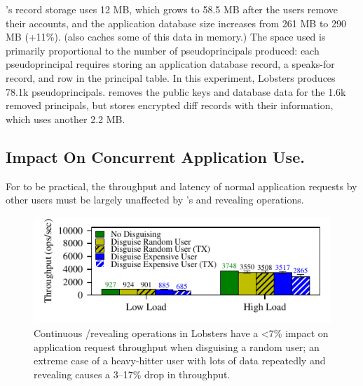 %
\sys's record storage uses 12 MB, which grows to
58.5 MB after the users remove their accounts, and the application database
size increases from 261 MB to 290 MB (+11\%).
%
(\sys also caches some of this data in memory.)
%
The space used is primarily proportional to the number of pseudoprincipals
produced: each pseudoprincipal requires storing an application database record, a
speaks-for record, and row in the principal table.
%
In this experiment, Lobsters produces 78.1k pseudoprincipals.
%
%
%
%
\sys removes the public keys and database data for the 1.6k removed principals, but
stores encrypted diff records with their information, which uses another 2.2 MB.
%
%

\subsection{Impact On Concurrent Application Use.}
\label{s:eval-conc}

%
%
%
For \sys to be practical, the throughput and latency of normal application requests
by other users must be largely unaffected by \sys's \xxing and revealing operations.
%
%

\begin{figure}[t]
    \centering
    \includegraphics[width=\columnwidth]{figs/lobsters_concurrent_results}
    \caption{Continuous \xxing/revealing operations in Lobsters
    have a <7\% impact on application request
    throughput when disguising a random user; an extreme case of a
    heavy-hitter user with lots of data repeatedly \xxing and revealing
    causes a 3--17\% drop in throughput.}
    \label{f:concurrent-lobsters}
\end{figure}

